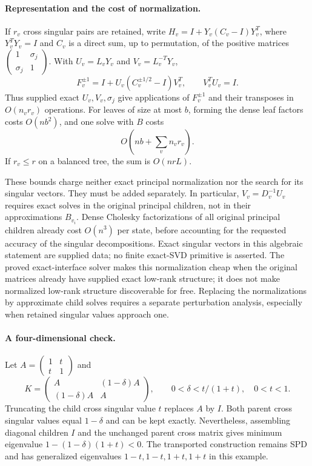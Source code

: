 \documentclass[11pt]{amsart}
\theoremstyle{definition}\newtheorem{definition}[theorem]{Definition}
\theoremstyle{remark}\newtheorem{remark}[theorem]{Remark}
\numberwithin{equation}{section}
\begin{document}
\paragraph{Representation and the cost of normalization.}
If $r_v$ cross singular pairs are retained, write
$H_v=I+Y_v(C_v-I)Y_v^T$, where $Y_v^TY_v=I$ and
$C_v$ is a direct sum, up to permutation, of the positive matrices
$\left(\begin{smallmatrix}1&\sigma_j\\\sigma_j&1\end{smallmatrix}\right)$.
With $U_v=L_vY_v$ and $V_v=L_v^{-T}Y_v$,
\[
 F_v^{\pm1}=I+U_v(C_v^{\pm1/2}-I)V_v^T,
 \qquad V_v^TU_v=I.
\]
Thus supplied exact $U_v,V_v,\sigma_j$ give applications of
$F_v^{\pm1}$ and their transposes in $O(n_vr_v)$ operations.
For leaves of size at most $b$, forming the dense leaf factors costs
$O(nb^2)$, and one solve with $B$ costs
\[
 O\left(nb+\sum_v n_vr_v\right).
\]
If $r_v\le r$ on a balanced tree, the sum is $O(nrL)$.

These bounds charge neither exact principal normalization nor the search
for its singular vectors. They must be added separately. In particular,
$V_v=D_v^{-1}U_v$ requires exact solves in the original principal
children, not in their approximations $B_{v_i}$.
Dense Cholesky factorizations of all original principal children already
cost $O(n^3)$ per state, before accounting for the requested accuracy of
the singular decompositions. Exact singular vectors in this algebraic
statement are supplied data; no finite exact-SVD primitive is asserted.
The proved exact-interface solver makes this normalization cheap when
the original matrices already have supplied exact low-rank structure;
it does not make normalized low-rank structure discoverable for free.
Replacing the normalizations by approximate child solves requires a
separate perturbation analysis, especially when retained singular values
approach one.

\paragraph{A four-dimensional check.}
Let $A=\left(\begin{smallmatrix}1&t\\t&1\end{smallmatrix}\right)$ and
\[
 K=\begin{pmatrix}A&(1-\delta)A\\(1-\delta)A&A\end{pmatrix},
 \qquad 0<\delta<t/(1+t),\quad 0<t<1.
\]
Truncating the child cross singular value $t$ replaces $A$ by $I$.
Both parent cross singular values equal $1-\delta$ and can be kept
exactly. Nevertheless, assembling diagonal children $I$ and the
unchanged parent cross matrix gives minimum eigenvalue
$1-(1-\delta)(1+t)<0$.
The transported construction remains SPD and has generalized
eigenvalues $1-t,1-t,1+t,1+t$ in this example.
\end{document}
